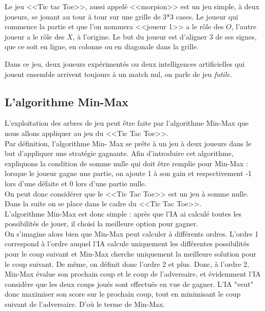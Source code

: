 \documentclass{article}
\begin{document}
Le jeu <<Tic tac Toe>>, aussi appelé <<morpion>> est un jeu simple, à deux joueurs, se jouant au tour à tour sur une grille de 3*3 cases.
Le joueur qui commence la partie et que l'on nommera <<joueur 1>> a le rôle des $O$, l'autre joueur a le rôle des $X$, à l'origine.
Le but du joueur est d'aligner 3 de ses signes, que ce soit en ligne, en colonne ou en diagonale dans la grille.

Dans ce jeu, deux joueurs expérimentés ou deux intelligences artificielles qui jouent ensemble arrivent toujours à un match
nul, on parle de jeu \emph{futile}.


\subsection{L'algorithme Min-Max}

L'exploitation des arbres de jeu peut être faite par l'algorithme Min-Max
que nous allons appliquer au jeu du <<Tic Tac Toe>>. \\

Par définition, l'algorithme Min-
Max se prête à un jeu à deux joueurs dans le but d'appliquer une stratégie
gagnante.
Afin d'introduire cet algorithme, expliquons la condition de somme nulle qui
doit être remplie pour Min-Max :
lorsque le joueur gagne une partie, on ajoute 1 à son gain et respectivement -1
lors
d'une défaite et 0 lors d'une partie nulle. \\

On peut donc considérer que le <<Tic Tac Toe>> est un jeu à somme nulle.
Dans la suite on se place dans le cadre du <<Tic Tac Toe>>. \\

L'algorithme Min-Max est donc simple : après que l'IA ai calculé toutes les
possibilités de jouer,
 il choisi la meilleure option pour gagner. \\

On s'imagine alors bien que Min-Max peut calculer à différents ordres. L'ordre 1
correspond à l'ordre auquel
l'IA calcule uniquement les différentes possibilités pour le coup suivant et
Min-Max cherche uniquement
la meilleure solution pour le coup suivant. De même, on définit donc l'ordre 2
et plus.
Donc, à l'ordre 2, Min-Max évalue son prochain coup et le coup de l'adversaire,
et évidemment
l'IA considère que les deux coups joués sont effectués en vue de gagner. L'IA
"veut" donc
maximiser son score sur le prochain coup, tout en minimisant le coup suivant de
l'adversaire.
D'où le terme de Min-Max. 
\end{document}
